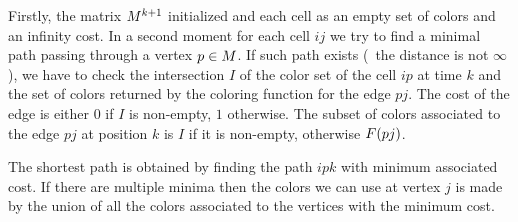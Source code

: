 Firstly, the matrix $M^{k+1}$ initialized and each cell as an empty set of colors and an infinity cost. In a second moment for each cell $ij$ we try to find a minimal path passing through a vertex $p \in M$. If such path exists (\ie\ the distance is not $\infty$), we have to check the intersection $I$ of the color set of the cell $ip$ at time $k$ and the set of colors returned by the coloring function for the edge $pj$. The cost of the edge is either $0$ if $I$ is non-empty, $1$ otherwise. The subset of colors associated to the edge $pj$ at position $k$ is $I$ if it is non-empty, otherwise $F(pj)$.

The shortest path is obtained by finding the path $ipk$ with minimum associated cost. If there are multiple minima then the colors we can use at vertex $j$ is made by the union of all the colors associated to the vertices with the minimum cost.
